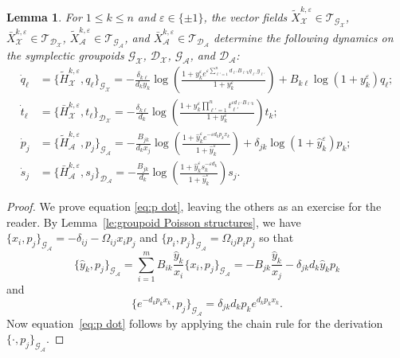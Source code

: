 \documentclass{amsart}
\newtheorem{lemma}[theorem]{Lemma}
\numberwithin{equation}{section}
\newcommand{\cA}{\mathcal{A}}
\newcommand{\cG}{\mathcal{G}}
\newcommand{\cD}{\mathcal{D}}
\newcommand{\cX}{\mathcal{X}}
\newcommand{\cT}{\mathcal{T}}
\begin{document}
\begin{lemma}
  For $1\le k\le n$ and $\varepsilon\in\{\pm1\}$, the vector fields $\tilde X_\cX^{k,\varepsilon}\in\cT_{\cG_\cX}$, $\bar X_\cX^{k,\varepsilon}\in\cT_{\cD_\cX}$, $\tilde X_\cA^{k,\varepsilon}\in\cT_{\cG_\cA}$, and $\bar X_\cA^{k,\varepsilon}\in\cT_{\cD_\cA}$ determine the following dynamics on the symplectic groupoids $\cG_\cX$, $\cD_\cX$, $\cG_\cA$, and $\cD_\cA$:
  \begin{align}
    \dot q_\ell&=\{\tilde H_\cX^{k,\varepsilon},q_\ell\}_{\cG_\cX}=-\frac{\delta_{k\ell}}{d_ky_k}\log\left(\frac{1+y_k^\varepsilon e^{\varepsilon\sum_{\ell'=1}^n d_{\ell'} B_{\ell' k}q_{\ell'} y_{\ell'}}}{1+y_k^\varepsilon}\right)+B_{k\ell}\log(1+y_k^\varepsilon)q_\ell;\\
    \dot t_\ell&=\{\bar H_\cX^{k,\varepsilon},t_\ell\}_{\cD_\cX}=-\frac{\delta_{k\ell}}{d_k}\log\left(\frac{1+y_k^\varepsilon \prod_{\ell'=1}^nt_{\ell'}^{\varepsilon d_{\ell'} B_{\ell' k}}}{1+y_k^\varepsilon}\right)t_k;\\
    \label{eq:p dot}\dot p_j&=\{\tilde H_\cA^{k,\varepsilon},p_j\}_{\cG_\cA}=-\frac{B_{jk}}{d_kx_j}\log\left(\frac{1+\hat y_k^\varepsilon e^{-\varepsilon d_kp_kx_k}}{1+\hat y_k^\varepsilon}\right)+\delta_{jk}\log(1+\hat y_k^\varepsilon)p_k;\\
    \label{eq:s dot}\dot s_j&=\{\bar H_\cA^{k,\varepsilon},s_j\}_{\cD_\cA}=-\frac{B_{jk}}{d_k}\log\left(\frac{1+\hat y_k^\varepsilon s_k^{-\varepsilon d_k}}{1+\hat y_k^\varepsilon}\right)s_j.
  \end{align}
\end{lemma}
\begin{proof}
  We prove equation \eqref{eq:p dot}, leaving the others as an exercise for the reader.
  By Lemma~\ref{le:groupoid Poisson structures}, we have $\{x_i,p_j\}_{\cG_\cA}=-\delta_{ij}-\Omega_{ij}x_ip_j$ and $\{p_i,p_j\}_{\cG_\cA}=\Omega_{ij}p_ip_j$ so that
  \[\{\hat y_k,p_j\}_{\cG_\cA}=\sum_{i=1}^m B_{ik}\frac{\hat y_k}{x_i}\{x_i,p_j\}_{\cG_\cA}=-B_{jk}\frac{\hat y_k}{x_j}-\delta_{jk}d_k\hat y_kp_k\]
  and
  \[\{e^{-d_kp_kx_k},p_j\}_{\cG_\cA}=\delta_{jk}d_kp_ke^{d_kp_kx_k}.\]
  Now equation~\eqref{eq:p dot} follows by applying the chain rule for the derivation $\{\cdot,p_j\}_{\cG_\cA}$.
\end{proof}
\end{document}

